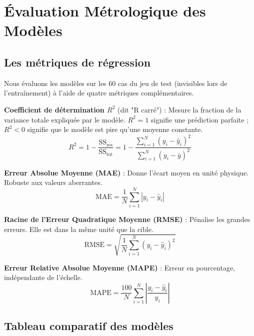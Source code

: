 \documentclass[journal, a4paper, twocolumn]{IEEEtran}
\begin{document}
\section{Évaluation Métrologique des Modèles}

\subsection{Les métriques de régression}

Nous évaluons les modèles sur les 60 cas du jeu de test (invisibles lors de l'entraînement) à l'aide de quatre métriques complémentaires.

\textbf{Coefficient de détermination $R^2$} (dit "R carré") : Mesure la fraction de la variance totale expliquée par le modèle. $R^2 = 1$ signifie une prédiction parfaite ; $R^2 < 0$ signifie que le modèle est pire qu'une moyenne constante.
\begin{equation}
    R^2 = 1 - \frac{\text{SS}_{\text{res}}}{\text{SS}_{\text{tot}}} = 1 - \frac{\sum_{i=1}^{N}(y_i - \hat{y}_i)^2}{\sum_{i=1}^{N}(y_i - \bar{y})^2}
\end{equation}

\textbf{Erreur Absolue Moyenne (MAE)} : Donne l'écart moyen en unité physique. Robuste aux valeurs aberrantes.
\begin{equation}
    \text{MAE} = \frac{1}{N}\sum_{i=1}^{N} |y_i - \hat{y}_i|
\end{equation}

\textbf{Racine de l'Erreur Quadratique Moyenne (RMSE)} : Pénalise les grandes erreurs. Elle est dans la même unité que la cible.
\begin{equation}
    \text{RMSE} = \sqrt{\frac{1}{N}\sum_{i=1}^{N}(y_i - \hat{y}_i)^2}
\end{equation}

\textbf{Erreur Relative Absolue Moyenne (MAPE)} : Erreur en pourcentage, indépendante de l'échelle.
\begin{equation}
    \text{MAPE} = \frac{100}{N}\sum_{i=1}^{N}\left|\frac{y_i - \hat{y}_i}{y_i}\right|
\end{equation}

\subsection{Tableau comparatif des modèles}
\end{document}
